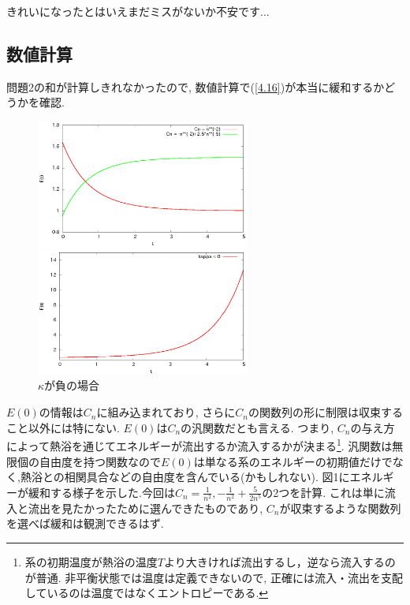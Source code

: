 \documentclass[10.5pt,a4paper]{jreport}
\makeatletter
\newcommand{\figcaption}[1]{\def\@captype{figure}\caption{#1}} %
\makeatother
\begin{document}
きれいになったとはいえまだミスがないか不安です...
\subsection{数値計算}
問題2の和が計算しきれなかったので, 数値計算で(\ref{4.16})が本当に緩和するかどうかを確認.
\begin{figure}[htbp]
  \begin{minipage}{0.5\hsize}
    \centering
    \includegraphics[width = 7cm]{./fig1.eps}
    \figcaption{$\kappa = \overline{n} = 1$}
    \label{fig1}
  \end{minipage}
  \begin{minipage}{0.5\hsize}
    \centering
    \includegraphics[width = 7cm]{./fig2.eps}
    \figcaption{$\kappa$が負の場合}
    \label{fig2}
  \end{minipage}
\end{figure}
$E(0)$の情報は$C_n$に組み込まれており, さらに$C_n$の関数列の形に制限は収束すること以外には特にない. $E(0)$は$C_n$の汎関数だとも言える. つまり, $C_n$の与え方によって熱浴を通じてエネルギーが流出するか流入するかが決まる\footnote{系の初期温度が熱浴の温度$T$より大きければ流出するし，逆なら流入するのが普通. 非平衡状態では温度は定義できないので, 正確には流入・流出を支配しているのは温度ではなくエントロピーである.}. 汎関数は無限個の自由度を持つ関数なので$E(0)$は単なる系のエネルギーの初期値だけでなく,熱浴との相関具合などの自由度を含んでいる(かもしれない). 図1にエネルギーが緩和する様子を示した.今回は$C_n = \frac{1}{n^2}, -\frac{1}{n^2} + \frac{5}{2n^5}$の2つを計算. これは単に流入と流出を見たかったために選んできたものであり, $C_n$が収束するような関数列を選べば緩和は観測できるはず.
\end{document}
